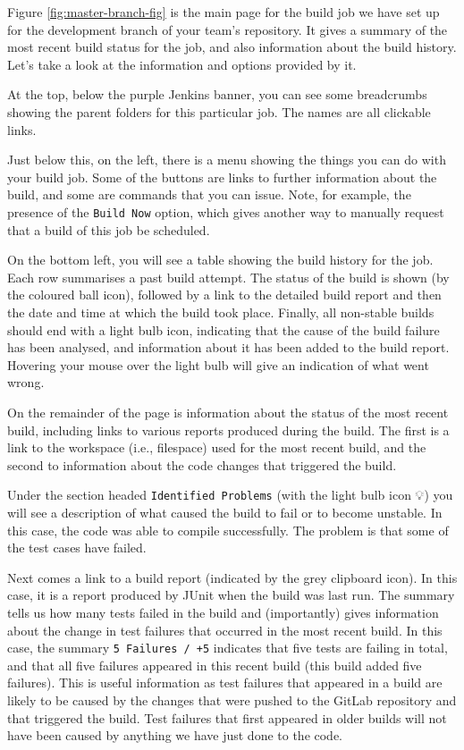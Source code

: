 \documentclass[
]{book}
\begin{document}
Figure \ref{fig:master-branch-fig} is the main page for the build job we have set up for the development branch of your team's repository. It gives a summary of the most recent build status for the job, and also information about the build history. Let's take a look at the information and options provided by it.

At the top, below the purple Jenkins banner, you can see some breadcrumbs showing the parent folders for this particular job. The names are all clickable links.

Just below this, on the left, there is a menu showing the things you can do with your build job. Some of the buttons are links to further information about the build, and some are commands that you can issue. Note, for example, the presence of the \texttt{Build\ Now} option, which gives another way to manually request that a build of this job be scheduled.

On the bottom left, you will see a table showing the build history for the job. Each row summarises a past build attempt. The status of the build is shown (by the coloured ball icon), followed by a link to the detailed build report and then the date and time at which the build took place. Finally, all non-stable builds should end with a light bulb icon, indicating that the cause of the build failure has been analysed, and information about it has been added to the build report. Hovering your mouse over the light bulb will give an indication of what went wrong.

On the remainder of the page is information about the status of the most recent build, including links to various reports produced during the build. The first is a link to the workspace (i.e., filespace) used for the most recent build, and the second to information about the code changes that triggered the build.

Under the section headed \texttt{Identified\ Problems} (with the light bulb icon 💡) you will see a description of what caused the build to fail or to become unstable. In this case, the code was able to compile successfully. The problem is that some of the test cases have failed.

Next comes a link to a build report (indicated by the grey clipboard icon). In this case, it is a report produced by JUnit when the build was last run. The summary tells us how many tests failed in the build and (importantly) gives information about the change in test failures that occurred in the most recent build. In this case, the summary \texttt{5\ Failures\ /\ +5} indicates that five tests are failing in total, and that all five failures appeared in this recent build (this build added five failures). This is useful information as test failures that appeared in a build are likely to be caused by the changes that were pushed to the GitLab repository and that triggered the build. Test failures that first appeared in older builds will not have been caused by anything we have just done to the code.
\end{document}
